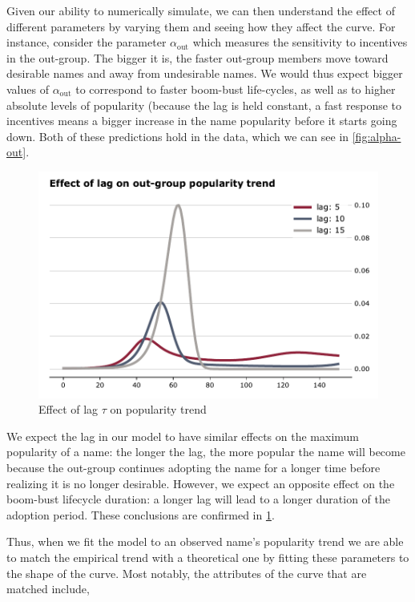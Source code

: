 \documentclass[a4paper]{article}
\begin{document}
Given our ability to numerically simulate, we can then understand the effect of
different parameters by varying them and seeing how they affect the curve. For
instance, consider the parameter $\alpha_\text{out}$ which measures the
sensitivity to incentives in the out-group. The bigger it is, the faster
out-group members move toward desirable names and away from undesirable names.
We would thus expect bigger values of $\alpha_\text{out}$ to correspond to faster
boom-bust life-cycles, as well as to higher absolute levels of popularity
(because the lag is held constant, a fast response to incentives means a bigger
increase in the name popularity before it starts going down. Both of these
predictions hold in the data, which we can see in \cref{fig:alpha-out}.

\begin{figure}[h]
\centering
\includegraphics[width=.9\textwidth]{figs/out-lag}
\caption{Effect of lag $\tau$ on popularity trend}
\label{fig:out-lag}
\end{figure}

We expect the lag in our model to have similar effects on the maximum popularity
of a name: the longer the lag, the more popular the name will become because the
out-group continues adopting the name for a longer time before realizing it is
no longer desirable. However, we expect an opposite effect on the boom-bust
lifecycle duration: a longer lag will lead to a longer duration of the adoption
period. These conclusions are confirmed in \cref{fig:out-lag}.

Thus, when we fit the model to an observed name's popularity trend we are able
to match the empirical trend with a theoretical one by fitting these parameters
to the shape of the curve. Most notably, the attributes of the curve that are
matched include,
\end{document}
